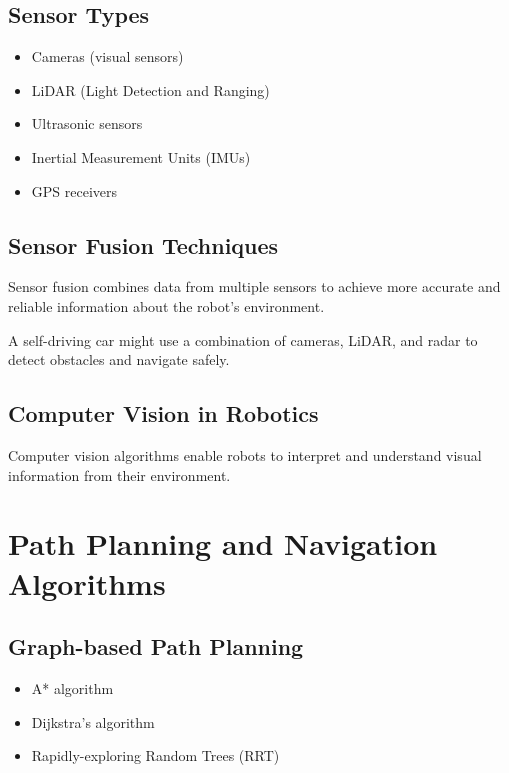 \documentclass[
]{article}
\begin{document}
\subsection{Sensor Types}
\begin{itemize}
    \item Cameras (visual sensors)
    \item LiDAR (Light Detection and Ranging)
    \item Ultrasonic sensors
    \item Inertial Measurement Units (IMUs)
    \item GPS receivers
\end{itemize}

\subsection{Sensor Fusion Techniques}

Sensor fusion combines data from multiple sensors to achieve more
accurate and reliable information about the robot's environment.

\begin{example}
A self-driving car might use a combination of cameras, LiDAR, and radar to detect obstacles and navigate safely.
\end{example}

\subsection{Computer Vision in Robotics}

Computer vision algorithms enable robots to interpret and understand
visual information from their environment.

\section{Path Planning and Navigation Algorithms}

\subsection{Graph-based Path Planning}
\begin{itemize}
    \item A* algorithm
    \item Dijkstra's algorithm
    \item Rapidly-exploring Random Trees (RRT)
\end{itemize}
\end{document}
